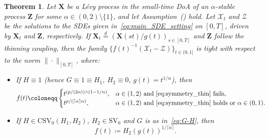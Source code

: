 \documentclass[en,oneside,bbfont,article]{amsart}
\newtheorem{theorem}{Theorem}[section]
\theoremstyle{remark}
\theoremstyle{definition}
\theoremstyle{definition}
\newcommand\X{\bm{\mathcal{X}}}
\newcommand\ZZ{\bm{\mathcal{Z}}}
\newcommand\1{\mathds{1}}
\newcommand\SV{\mathrm{SV}}
\newcommand\CSV{\mathrm{CSV}}
\newcommand\eqd{\overset{d}{=}}
\newcommand\nf[1]{\normalfont{#1}}
\begin{document}
\begin{theorem}
\label{thm:main_res_T}
Let $\bm{X}$ be a L\'evy process in the small-time DoA of an $
\alpha$-stable process $\bm{Z}$ for some $\alpha \in (0,2)\setminus\{1\}$, and let Assumption~() hold. Let $\X_t$ and $\ZZ$ be the solutions to the SDEs given in~\eqref{eq:main_SDE_setting} on $[0,T]$, driven by $\bm{X}_t$ and $\bm{Z}$, respectively. If $\bm{X}_t\eqd(\bm{X}(st)/g(t))_{s\in[0,T]}$ and $\bm{Z}$ follow the thinning coupling, then the family $\{f(t)^{-1}(\X_t-\ZZ)\}_{t\in(0,1]}$ is tight with respect to the norm $\|\cdot\|_{[0,T]}$, where:
\begin{itemize}[leftmargin=4.5em]
\item[\nf{\textbf{DoNA}}]%
If $H\equiv 1$ (hence $G\equiv 1\equiv H_1$, $H_2\equiv 0$, $g(t)=t^{1/\alpha}$), then 
\[
f(t)\coloneqq
\begin{cases}
t^{(p/(2\alpha))\wedge (1-1/\alpha) }, &\alpha\in(1,2)\text{ and \eqref{eq:symmetry_thin} fails}, \\
t^{p/(\lceil\alpha\rceil\alpha)}, &\alpha\in(1,2)\text{ and \eqref{eq:symmetry_thin} holds or $\alpha\in(0,1)$}.
\end{cases}
\]
\item[\nf{\textbf{DoNNA}}]%
If $H\in\CSV_0(H_1,H_2)$, $H_2\in\SV_0$ and $G$ is as in~\eqref{eq:G-H}, then
\[
f(t)\coloneqq
H_2(g(t))^{1/\lceil\alpha\rceil}.
\]
\end{itemize}
\end{theorem}
\end{document}
